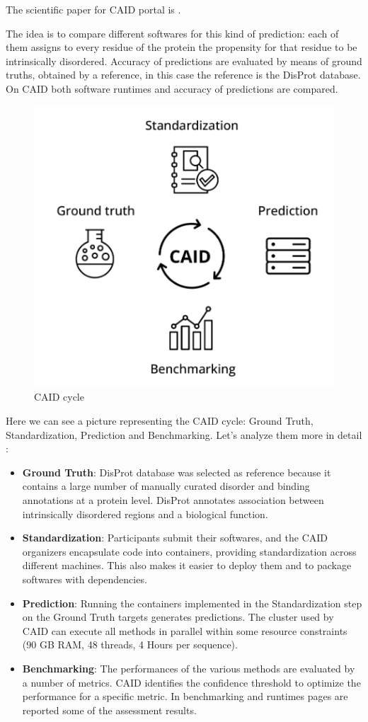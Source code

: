 The scientific paper for CAID portal is \cite{caid}.

The idea is to compare different softwares for this kind of prediction: each of them assigns to every residue of the protein the propensity for that residue to be intrinsically disordered. Accuracy of predictions are evaluated by means of ground truths, obtained by a reference, in this case the reference is the DisProt database. On CAID both software runtimes and accuracy of predictions are compared.

\begin{figure}
    \centering
    \includegraphics[scale=.5]{res/caid_cycle.png}
    \caption{CAID cycle \cite{caid}}
\end{figure}


Here we can see a picture representing the CAID cycle: Ground Truth, Standardization, Prediction and Benchmarking. Let's analyze them more in detail :
\begin{itemize}
    \item \textbf{Ground Truth}: DisProt database was selected as reference because it contains a large number of manually curated disorder and binding annotations at a protein level. DisProt annotates association between intrinsically disordered regions and a biological function.
    \item \textbf{Standardization}: Participants submit their softwares, and the CAID organizers encapsulate code into containers, providing standardization across different machines. This also makes it easier to deploy them and to package softwares with dependencies.
    \item \textbf{Prediction}: Running the containers implemented in the Standardization step on the Ground Truth targets generates predictions. The cluster used by CAID can execute all methods in parallel within some resource constraints (90 GB RAM, 48 threads, 4 Hours per sequence).
    \item \textbf{Benchmarking}: The performances of the various methods are evaluated by a number of metrics. CAID identifies the confidence threshold to optimize the performance for a specific metric. In benchmarking and runtimes pages are reported some of the assessment results.
\end{itemize}

